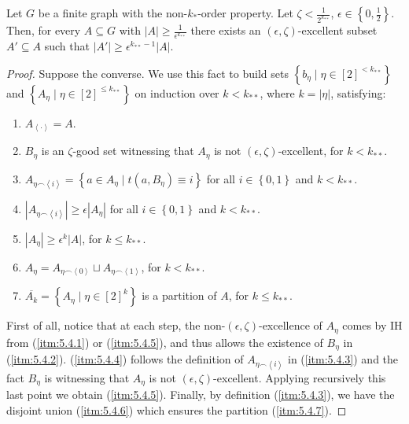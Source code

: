     \lemma[Claim 5.4]\label{existance_of_excellent_subsets}
        Let $G$ be a finite graph with the non-$k_{*}$-order property.
        Let $\zeta < \frac{1}{2^{k_{**}}}$, $\epsilon \in \left\{ 0, \frac{1}{2} \right\}$.
        Then, for every $A \subseteq G$ with $|A| \geq \frac{1}{\epsilon^{k_{**}}}$ there exists an $(\epsilon, \zeta)$-excellent
        subset $A' \subseteq A$ such that $|A'| \geq \epsilon^{k_{**}-1} |A|$.
        \begin{proof}
            Suppose the converse.
            We use this fact to build sets $\left\{ b_\eta \mid \eta \in [2]^{<k_{**}} \right\}$ and
            $\left\{ A_\eta \mid \eta \in [2]^{\leq k_{**}} \right\}$ on induction over $k<k_{**}$, where $k = |\eta|$,
            satisfying:
            \begin{enumerate}
                \item\label{itm:5.4.1} $A_{\left< \cdot \right>} = A$.
                \item\label{itm:5.4.2} $B_\eta$ is an $\zeta$-good set witnessing that $A_\eta$ is not
                    $(\epsilon, \zeta)$-excellent, for $k < k_{**}$.
                \item\label{itm:5.4.3} $A_{\eta \frown \left< i \right>} = \left\{ a \in A_\eta \mid t(a, B_\eta) \equiv i \right\}$
                    for all $i \in \left\{ 0,1 \right\}$ and $k < k_{**}$.
                \item\label{itm:5.4.4} $|A_{\eta \frown \left< i \right>}| \geq \epsilon |A_\eta|$
                    for all $i \in \left\{ 0,1 \right\}$ and $k < k_{**}$.
                \item\label{itm:5.4.5} $|A_\eta| \geq \epsilon^k |A|$, for $k \leq k_{**}$.
                \item\label{itm:5.4.6} $A_\eta = A_{\eta \frown \left< 0 \right>} \sqcup A_{\eta \frown \left< 1 \right>}$,
                    for $k < k_{**}$.
                \item\label{itm:5.4.7} $\overline{A_k} = \left\{ A_\eta \mid \eta \in [2]^k \right\}$ is a partition of $A$,
                    for $k \leq k_{**}$.
            \end{enumerate}
            First of all, notice that at each step, the non-$(\epsilon, \zeta)$-excellence of $A_\eta$ comes by IH
            from (\ref{itm:5.4.1}) or (\ref{itm:5.4.5}), and thus allows the existence of $B_\eta$ in (\ref{itm:5.4.2}).
            (\ref{itm:5.4.4}) follows the definition of $A_{\eta \frown \left< i \right>}$ in (\ref{itm:5.4.3}) and
            the fact $B_\eta$ is witnessing that $A_\eta$ is not $(\epsilon, \zeta)$-excellent.
            Applying recursively this last point we obtain (\ref{itm:5.4.5}).
            Finally, by definition (\ref{itm:5.4.3}), we have the disjoint union (\ref{itm:5.4.6}) which ensures
            the partition (\ref{itm:5.4.7}).


\end{proof}
